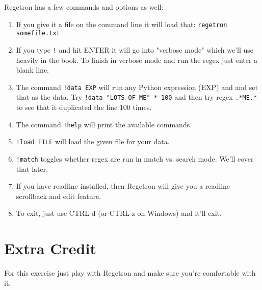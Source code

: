 Regetron has a few commands and options as well:

\begin{enumerate}
\item If you give it a file on the command line it will load that: \verb|regetron somefile.txt|
\item If you type \verb|!| and hit ENTER it will go into "verbose mode" which we'll use heavily in the book.  To finish in verbose mode and run the regex
    just enter a blank line.
\item The command \verb|!data EXP| will run any Python expression (EXP) and and set that as the data.  Try \verb|!data "LOTS OF ME" * 100| and then
    try regex \verb|.*ME.*| to see that it duplicated the line 100 times.
\item The command \verb|!help| will print the available commands.
\item \verb|!load FILE| will load the given file for your data.
\item \verb|!match| toggles whether regex are run in match vs. search mode.  We'll cover that later.
\item If you have readline installed, then Regetron will give you a readline scrollback and edit feature.
\item To exit, just use CTRL-d (or CTRL-z on Windows) and it'll exit.
\end{enumerate}

\section{Extra Credit}

For this exercise just play with Regetron and make sure you're comfortable with it.


